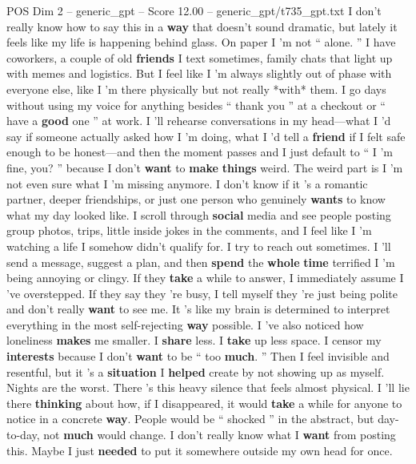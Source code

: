 \begin{textsample}{POS Dim 2 – generic\_gpt – Score 12.00 – generic\_gpt/t735\_gpt.txt}  \label{ex:f2_pos_033}
I don't really know how to say this in a \textbf{way} that doesn't sound dramatic, but lately it feels like my life is happening behind glass.
On paper I ’m not “ alone. ” I have coworkers, a couple of old \textbf{friends} I text sometimes, family chats that light up with memes and logistics.
But I feel like I ’m always slightly out of phase with everyone else, like I ’m there physically but not really *with* them.
I go days without using my voice for anything besides “ thank you ” at a checkout or “ have a \textbf{good} one ” at work.
I ’ll rehearse conversations in my head—what I ’d say if someone actually asked how I ’m doing, what I ’d tell a \textbf{friend} if I felt safe enough to be honest—and then the moment passes and I just default to “ I ’m fine, you? ” because I don't \textbf{want} to \textbf{make} \textbf{things} weird.
The weird part is I ’m not even sure what I ’m missing anymore.
I don't know if it ’s a romantic partner, deeper friendships, or just one person who genuinely \textbf{wants} to know what my day looked like.
I scroll through \textbf{social} media and see people posting group photos, trips, little inside jokes in the comments, and I feel like I ’m watching a life I somehow didn't qualify for.
I try to reach out sometimes.
I ’ll send a message, suggest a plan, and then \textbf{spend} the \textbf{whole} \textbf{time} terrified I ’m being annoying or clingy.
If they \textbf{take} a while to answer, I immediately assume I ’ve overstepped.
If they say they ’re busy, I tell myself they ’re just being polite and don't really \textbf{want} to see me.
It ’s like my brain is determined to interpret everything in the most self-rejecting \textbf{way} possible.
I ’ve also noticed how loneliness \textbf{makes} me smaller.
I \textbf{share} less.
I \textbf{take} up less space.
I censor my \textbf{interests} because I don't \textbf{want} to be “ too \textbf{much}. ” Then I feel invisible and resentful, but it ’s a \textbf{situation} I \textbf{helped} create by not showing up as myself.
Nights are the worst.
There ’s this heavy silence that feels almost physical.
I ’ll lie there \textbf{thinking} about how, if I disappeared, it would \textbf{take} a while for anyone to notice in a concrete \textbf{way}.
People would be “ shocked ” in the abstract, but day-to-day, not \textbf{much} would change.
I don't really know what I \textbf{want} from posting this.
Maybe I just \textbf{needed} to put it somewhere outside my own head for once.

\end{textsample}
